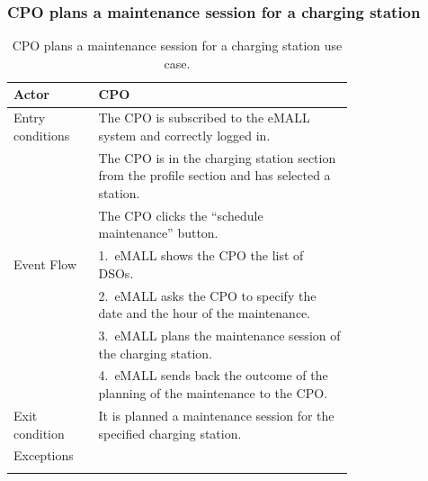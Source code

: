 \subsubsection*{CPO plans a maintenance session for a charging station}
\begin{center}
    \begin{longtable}{lp{0.75\linewidth}}
        \hline
        Actor            & CPO                                                                                             \\
        \hline
        Entry conditions & The CPO is subscribed to the eMALL system and correctly logged in.                              \\
        & The CPO is in the charging station section from the profile section and has selected a station. \\
        & The CPO clicks the ``schedule maintenance'' button.                                             \\
        \hline
        Event Flow       & 1.\ eMALL shows the CPO the list of DSOs.                                                       \\
        & 2.\ eMALL asks the CPO to specify the date and the hour of the maintenance.                     \\
        & 3.\ eMALL plans the maintenance session of the charging station.                                \\
        & 4.\ eMALL sends back the outcome of the planning of the maintenance to the CPO.                 \\
        \hline
        Exit condition   & It is planned a maintenance session for the specified charging station.                         \\
        \hline
        Exceptions       &                                                                                                 \\
        \hline
        \caption{CPO plans a maintenance session for a charging station use case.}
        \label{tab: CPO_plans_maintenance_use_case}
    \end{longtable}
\end{center}

